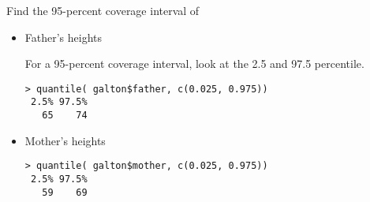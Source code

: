 Find the 95-percent coverage interval of
\begin{itemize}
\item Father's heights
\begin{MultipleChoice}
\end{MultipleChoice}

\begin{AnswerText}
For a 95-percent coverage interval, look at the 2.5 and 97.5
percentile.
\begin{verbatim}
> quantile( galton$father, c(0.025, 0.975))
 2.5% 97.5% 
   65    74 
\end{verbatim}
\end{AnswerText}

\item Mother's heights
\begin{MultipleChoice}
\end{MultipleChoice}

\begin{AnswerText}
\begin{verbatim}
> quantile( galton$mother, c(0.025, 0.975))
 2.5% 97.5% 
   59    69 
\end{verbatim}
\end{AnswerText}
\end{itemize}

